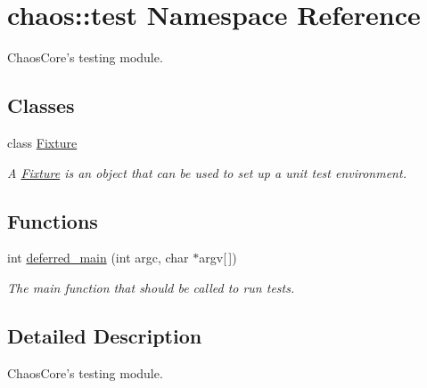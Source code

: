 \hypertarget{namespacechaos_1_1test}{\section{chaos\-:\-:test Namespace Reference}
\label{namespacechaos_1_1test}
}


Chaos\-Core's testing module.  


\subsection*{Classes}
\begin{DoxyCompactItemize}
\item 
class \hyperlink{classchaos_1_1test_1_1_fixture}{Fixture}
\begin{DoxyCompactList}\small\item\em A \hyperlink{classchaos_1_1test_1_1_fixture}{Fixture} is an object that can be used to set up a unit test environment. \end{DoxyCompactList}\end{DoxyCompactItemize}
\subsection*{Functions}
\begin{DoxyCompactItemize}
\item 
\hypertarget{namespacechaos_1_1test_a1ae4ccfac97ca99463a922d8353ab274}{int \hyperlink{namespacechaos_1_1test_a1ae4ccfac97ca99463a922d8353ab274}{deferred\-\_\-main} (int argc, char $\ast$argv\mbox{[}$\,$\mbox{]})}\label{namespacechaos_1_1test_a1ae4ccfac97ca99463a922d8353ab274}

\begin{DoxyCompactList}\small\item\em The main function that should be called to run tests. \end{DoxyCompactList}\end{DoxyCompactItemize}


\subsection{Detailed Description}
Chaos\-Core's testing module. 